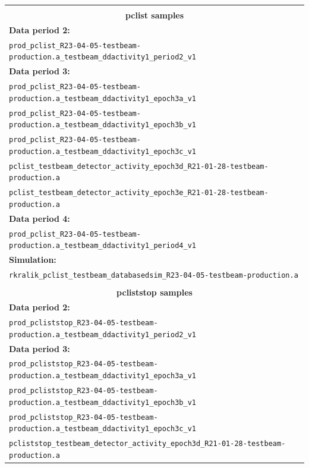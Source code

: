 \documentclass[12pt,a4paper]{article}
\begin{document}
\begin{table}[!ht]
\centering
\hspace*{-8mm}
\begin{tabular}{l}
\hline\hline\\
\multicolumn{1}{c}{\textbf{pclist samples}}\\[3pt]\hline
\textbf{Data period 2:}\\
\texttt{prod\_pclist\_R23-04-05-testbeam-production.a\_testbeam\_ddactivity1\_period2\_v1}\\
\textbf{Data period 3:}\\
\texttt{prod\_pclist\_R23-04-05-testbeam-production.a\_testbeam\_ddactivity1\_epoch3a\_v1}\\
\texttt{prod\_pclist\_R23-04-05-testbeam-production.a\_testbeam\_ddactivity1\_epoch3b\_v1}\\
\texttt{prod\_pclist\_R23-04-05-testbeam-production.a\_testbeam\_ddactivity1\_epoch3c\_v1}\\
\texttt{pclist\_testbeam\_detector\_activity\_epoch3d\_R21-01-28-testbeam-production.a}\\
\texttt{pclist\_testbeam\_detector\_activity\_epoch3e\_R21-01-28-testbeam-production.a}\\
\textbf{Data period 4:}\\
\texttt{prod\_pclist\_R23-04-05-testbeam-production.a\_testbeam\_ddactivity1\_period4\_v1}\\
\textbf{Simulation:}\\
\texttt{rkralik\_pclist\_testbeam\_databasedsim\_R23-04-05-testbeam-production.a}\\[5pt]
\hline\hline\\
\multicolumn{1}{c}{\textbf{pcliststop samples}}\\[3pt]\hline
\textbf{Data period 2:}\\
\texttt{prod\_pcliststop\_R23-04-05-testbeam-production.a\_testbeam\_ddactivity1\_period2\_v1}\\
\textbf{Data period 3:}\\
\texttt{prod\_pcliststop\_R23-04-05-testbeam-production.a\_testbeam\_ddactivity1\_epoch3a\_v1}\\
\texttt{prod\_pcliststop\_R23-04-05-testbeam-production.a\_testbeam\_ddactivity1\_epoch3b\_v1}\\
\texttt{prod\_pcliststop\_R23-04-05-testbeam-production.a\_testbeam\_ddactivity1\_epoch3c\_v1}\\
\texttt{pcliststop\_testbeam\_detector\_activity\_epoch3d\_R21-01-28-testbeam-production.a}\\

\end{tabular}
\end{table}
\end{document}
